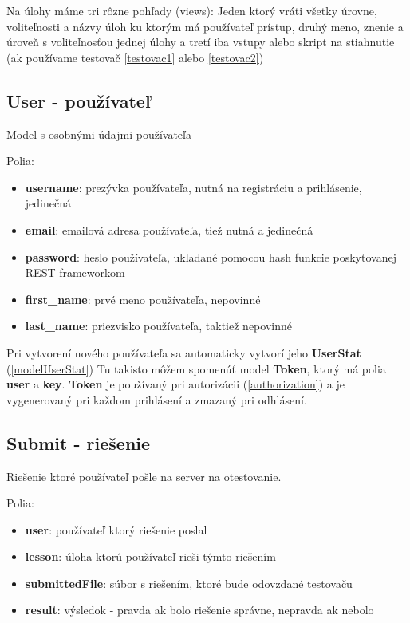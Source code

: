 Na úlohy máme tri rôzne pohľady (views): Jeden ktorý vráti všetky úrovne, voliteľnosti a názvy úloh ku ktorým má
používateľ prístup, druhý meno, znenie a úroveň s voliteľnosťou jednej úlohy a tretí
iba vstupy alebo skript na stiahnutie (ak používame testovač \ref{testovac1} alebo \ref{testovac2})

\subsection{User - používateľ}
Model s osobnými údajmi používateľa

Polia:
\begin{itemize}
\item \textbf{username}: prezývka používateľa, nutná na registráciu a prihlásenie, jedinečná
\item \textbf{email}: emailová adresa používateľa, tiež nutná a jedinečná
\item \textbf{password}: heslo používateľa, ukladané pomocou hash funkcie poskytovanej
                        REST frameworkom
\item \textbf{first\_name}: prvé meno používateľa, nepovinné
\item \textbf{last\_name}: priezvisko používateľa, taktiež nepovinné
\end{itemize}

Pri vytvorení nového používateľa sa automaticky vytvorí jeho \textbf{UserStat} (\ref{modelUserStat})
\newline
Tu takisto môžem spomenúť model \textbf{Token}, ktorý má polia \textbf{user} a \textbf{key}.
\textbf{Token} je používaný pri autorizácii (\ref{authorization}) a je vygenerovaný
pri každom prihlásení a zmazaný pri odhlásení.
\newpage
\subsection{Submit - riešenie}
Riešenie ktoré používateľ pošle na server na otestovanie.

Polia:
\begin{itemize}
\item \textbf{user}: používateľ ktorý riešenie poslal
\item \textbf{lesson}: úloha ktorú používateľ rieši týmto riešením
\item \textbf{submittedFile}: súbor s riešením, ktoré bude odovzdané testovaču
\item \textbf{result}: výsledok - pravda ak bolo riešenie správne, nepravda ak nebolo
\end{itemize}


